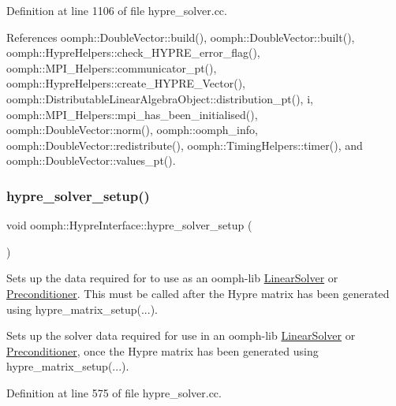 Definition at line 1106 of file hypre\+\_\+solver.\+cc.



References oomph\+::\+Double\+Vector\+::build(), oomph\+::\+Double\+Vector\+::built(), oomph\+::\+Hypre\+Helpers\+::check\+\_\+\+H\+Y\+P\+R\+E\+\_\+error\+\_\+flag(), oomph\+::\+M\+P\+I\+\_\+\+Helpers\+::communicator\+\_\+pt(), oomph\+::\+Hypre\+Helpers\+::create\+\_\+\+H\+Y\+P\+R\+E\+\_\+\+Vector(), oomph\+::\+Distributable\+Linear\+Algebra\+Object\+::distribution\+\_\+pt(), i, oomph\+::\+M\+P\+I\+\_\+\+Helpers\+::mpi\+\_\+has\+\_\+been\+\_\+initialised(), oomph\+::\+Double\+Vector\+::norm(), oomph\+::oomph\+\_\+info, oomph\+::\+Double\+Vector\+::redistribute(), oomph\+::\+Timing\+Helpers\+::timer(), and oomph\+::\+Double\+Vector\+::values\+\_\+pt().

\mbox{\label{classoomph_1_1HypreInterface_afeddc250f9c56ac94e8c013c23a69deb}} 
\subsubsection{\texorpdfstring{hypre\+\_\+solver\+\_\+setup()}{hypre\_solver\_setup()}}
{\footnotesize\ttfamily void oomph\+::\+Hypre\+Interface\+::hypre\+\_\+solver\+\_\+setup (\begin{DoxyParamCaption}{ }\end{DoxyParamCaption})\hspace{0.3cm}{\ttfamily [protected]}}



Sets up the data required for to use as an oomph-\/lib \hyperlink{classoomph_1_1LinearSolver}{Linear\+Solver} or \hyperlink{classoomph_1_1Preconditioner}{Preconditioner}. This must be called after the Hypre matrix has been generated using hypre\+\_\+matrix\+\_\+setup(...). 

Sets up the solver data required for use in an oomph-\/lib \hyperlink{classoomph_1_1LinearSolver}{Linear\+Solver} or \hyperlink{classoomph_1_1Preconditioner}{Preconditioner}, once the Hypre matrix has been generated using hypre\+\_\+matrix\+\_\+setup(...). 

Definition at line 575 of file hypre\+\_\+solver.\+cc.



